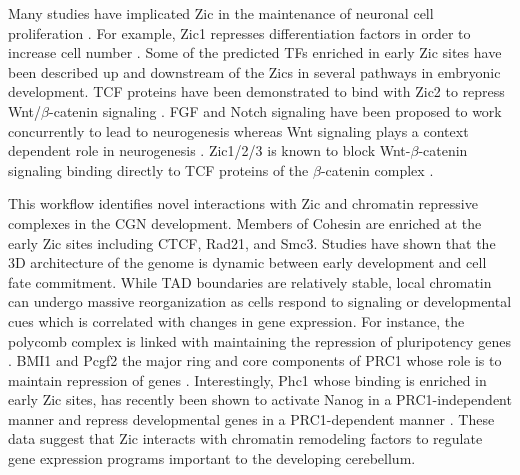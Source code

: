 \documentclass[fleqn,10pt]{wlscirep}
\begin{document}


Many studies have implicated Zic in the maintenance of neuronal cell proliferation \cite{ Lim2007Zic3Cells, Janesick2013ERFNeurogenesis, Aruga2002Zic1Differentiation, Ebert2003Zic1Autoregulation }. For example, Zic1 represses differentiation factors in order to increase cell number \cite{Aruga2002Zic1Differentiation}. Some of the predicted TFs enriched in early Zic sites have been described up and downstream of the Zics in several pathways in embryonic development. TCF proteins have been demonstrated to bind with Zic2 to repress  Wnt/$\beta$-catenin signaling \cite{Aruga2018Zic1, Lowenstein2021Olig3Development}. FGF and Notch signaling have been proposed to work concurrently to lead to neurogenesis \cite{Voelkel2014FGFHierarchy} whereas Wnt signaling plays a context dependent role in neurogenesis \cite{Lassiter2014SignalingDelamination}. Zic1/2/3 is known to block Wnt-$\beta$-catenin signaling binding directly to TCF proteins of the $\beta$-catenin complex \cite{Ge2020Zic1Transition, Fujimi2012XenopusPathway, Murgan2015AtypicalPrecursors, Pourebrahim2011TranscriptionSignaling, Aruga2018ZicDisease,Aruga2018Zic1,Lowenstein2021Olig3Development}.  



This workflow identifies novel interactions with Zic and chromatin repressive complexes in the CGN development. Members of Cohesin are enriched at the early Zic sites including CTCF, Rad21, and Smc3. Studies have shown that the 3D architecture of the genome is dynamic between early development and cell fate commitment. While TAD boundaries are relatively stable, local chromatin can undergo massive reorganization as cells respond to signaling or developmental cues which is correlated with changes in gene expression\cite{Zheng2019TheDifferentiation, Bonev2016OrganizationGenome}. For instance, the polycomb complex is linked with maintaining the repression of pluripotency genes \cite{Riising2014GeneWide}. BMI1 and Pcgf2 the major ring  and core components of PRC1 whose role is to maintain repression of genes \cite{Aranda2015RegulationProteins}. Interestingly, Phc1 whose binding is enriched in early Zic sites, has recently been shown to activate  Nanog in a PRC1-independent manner and repress developmental genes in a PRC1-dependent manner \cite{Chen2021Phc1Locus}. These data suggest that Zic interacts with chromatin remodeling factors to regulate gene expression programs important to the developing cerebellum. 
\end{document}
